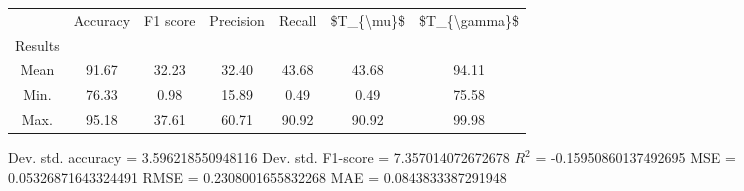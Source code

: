 \begin{tabular}{|c|c|c|c|c|c|c|}
\toprule
{} &  Accuracy &  F1 score &  Precision &  Recall &  \$T\_\{\textbackslash mu\}\$ &  \$T\_\{\textbackslash gamma\}\$ \\
Results &           &           &            &         &            &               \\
\hline
Mean    &     91.67 &     32.23 &      32.40 &   43.68 &      43.68 &         94.11 \\
Min.    &     76.33 &      0.98 &      15.89 &    0.49 &       0.49 &         75.58 \\
Max.    &     95.18 &     37.61 &      60.71 &   90.92 &      90.92 &         99.98 \\
\bottomrule
\end{tabular}

 Dev. std. accuracy = 3.596218550948116
 Dev. std. F1-score = 7.357014072672678
 $R^2$ = -0.15950860137492695
 MSE = 0.05326871643324491
 RMSE = 0.2308001655832268
 MAE = 0.0843833387291948